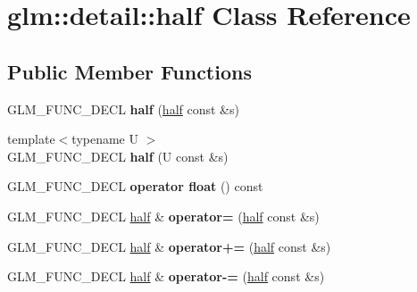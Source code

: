 \hypertarget{classglm_1_1detail_1_1half}{}\section{glm\+:\+:detail\+:\+:half Class Reference}
\label{classglm_1_1detail_1_1half}
\subsection*{Public Member Functions}
\begin{DoxyCompactItemize}
\item 
\hypertarget{classglm_1_1detail_1_1half_a14fb2431e4900ad9da30306186975477}{}G\+L\+M\+\_\+\+F\+U\+N\+C\+\_\+\+D\+E\+C\+L {\bfseries half} (\hyperlink{classglm_1_1detail_1_1half}{half} const \&s)\label{classglm_1_1detail_1_1half_a14fb2431e4900ad9da30306186975477}

\item 
\hypertarget{classglm_1_1detail_1_1half_a058baffdfe67cf3cc1979789c6f07979}{}{\footnotesize template$<$typename U $>$ }\\G\+L\+M\+\_\+\+F\+U\+N\+C\+\_\+\+D\+E\+C\+L {\bfseries half} (U const \&s)\label{classglm_1_1detail_1_1half_a058baffdfe67cf3cc1979789c6f07979}

\item 
\hypertarget{classglm_1_1detail_1_1half_ad52e9e6a6b25e2a69d806295d342655a}{}G\+L\+M\+\_\+\+F\+U\+N\+C\+\_\+\+D\+E\+C\+L {\bfseries operator float} () const \label{classglm_1_1detail_1_1half_ad52e9e6a6b25e2a69d806295d342655a}

\item 
\hypertarget{classglm_1_1detail_1_1half_a184ae21ab747a04d51ba40e757751261}{}G\+L\+M\+\_\+\+F\+U\+N\+C\+\_\+\+D\+E\+C\+L \hyperlink{classglm_1_1detail_1_1half}{half} \& {\bfseries operator=} (\hyperlink{classglm_1_1detail_1_1half}{half} const \&s)\label{classglm_1_1detail_1_1half_a184ae21ab747a04d51ba40e757751261}

\item 
\hypertarget{classglm_1_1detail_1_1half_aa4bf63310d4f1ee92671ac8dc34bb190}{}G\+L\+M\+\_\+\+F\+U\+N\+C\+\_\+\+D\+E\+C\+L \hyperlink{classglm_1_1detail_1_1half}{half} \& {\bfseries operator+=} (\hyperlink{classglm_1_1detail_1_1half}{half} const \&s)\label{classglm_1_1detail_1_1half_aa4bf63310d4f1ee92671ac8dc34bb190}

\item 
\hypertarget{classglm_1_1detail_1_1half_ace54fe7145e4dbda35e4fdeda15c6113}{}G\+L\+M\+\_\+\+F\+U\+N\+C\+\_\+\+D\+E\+C\+L \hyperlink{classglm_1_1detail_1_1half}{half} \& {\bfseries operator-\/=} (\hyperlink{classglm_1_1detail_1_1half}{half} const \&s)\label{classglm_1_1detail_1_1half_ace54fe7145e4dbda35e4fdeda15c6113}


\end{DoxyCompactItemize}
